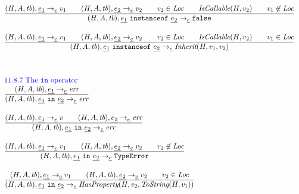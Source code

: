 \[\begin{array}{l@{~~}l@{~~}ll}
\frac{\begin{matrix}
\evale, \ir{e_1} \rightarrow_{\ir\expr} v_1
\rulesep
\evale, \ir{e_2} \rightarrow_{\ir\expr} v_2
\rulesep
v_2 \in \Loc
\rulesep
\hf{IsCallable}(H,v_2)
\rulesep
v_1 \not\in \Loc
\end{matrix}}{\begin{matrix}
\state, \ir{e_1} \ {\tt instanceof}\ \ir{e_2}
\rightarrow_{\ir\expr}
\false
\end{matrix}}
\\[2em]

\frac{\begin{matrix}
\evale, \ir{e_1} \rightarrow_{\ir\expr} v_1
\rulesep
\evale, \ir{e_2} \rightarrow_{\ir\expr} v_2
\rulesep
v_2 \in \Loc
\rulesep
\hf{IsCallable}(H,v_2)
\rulesep
v_1 \in \Loc
\end{matrix}}{\begin{matrix}
\state, \ir{e_1} \ {\tt instanceof}\ \ir{e_2}
\rightarrow_{\ir\expr}
\hf{Inherit}(H,v_1,v_2)
\end{matrix}}
\\[4em]


\mbox{\inblue 11.8.7 The {\tt in} operator}\\

\frac{\begin{matrix}
\evale, \ir{e_1} \rightarrow_{\ir\expr} \err
\end{matrix}}{\begin{matrix}
\state, \ir{e_1} \ {\tt in}\ \ir{e_2}
\rightarrow_{\ir\expr}
\err
\end{matrix}}
\\[2em]

\frac{\begin{matrix}
\evale, \ir{e_1} \rightarrow_{\ir\expr} v
\rulesep
\evale, \ir{e_2} \rightarrow_{\ir\expr} \err
\end{matrix}}{\begin{matrix}
\state, \ir{e_1} \ {\tt in}\ \ir{e_2}
\rightarrow_{\ir\expr}
\err
\end{matrix}}
\\[2em]

\frac{\begin{matrix}
\evale, \ir{e_1} \rightarrow_{\ir\expr} v_1
\rulesep
\evale, \ir{e_2} \rightarrow_{\ir\expr} v_2
\rulesep
v_2 \not\in \Loc
\end{matrix}}{\begin{matrix}
\state, \ir{e_1} \ {\tt in}\ \ir{e_2}
\rightarrow_{\ir\expr}
\te
\end{matrix}}
\\[2em]

\frac{\begin{matrix}
\evale, \ir{e_1} \rightarrow_{\ir\expr} v_1
\rulesep
\evale, \ir{e_2} \rightarrow_{\ir\expr} v_2
\rulesep
v_2 \in \Loc
\end{matrix}}{\begin{matrix}
\state, \ir{e_1} \ {\tt in}\ \ir{e_2}
\rightarrow_{\ir\expr}
\hf{HasProperty}(H,v_2,\hf{ToString}(H,v_1))
\end{matrix}}
\\[2em]
\end{array}
\]



